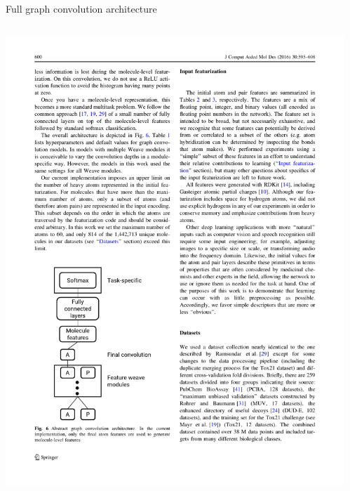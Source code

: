 \documentclass[xetex,compress]{beamer}
\begin{document}
\begin{frame}{Full graph convolution architecture}
  \begin{columns}
    \begin{column}{0.50\textwidth}
      \includegraphics[width=1.00\textwidth]{./figures/gc_fig6.pdf}
    \end{column}
    \begin{column}{0.50\textwidth}
    \end{column}
  \end{columns}
\end{frame}
\end{document}
